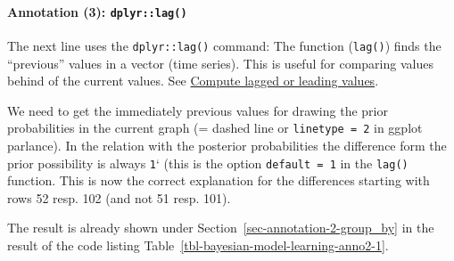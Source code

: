\documentclass[
  letterpaper,
  DIV=11,
  numbers=noendperiod]{scrreprt}
\let\oldparagraph\paragraph
\renewcommand{\paragraph}[1]{\oldparagraph{#1}\mbox{}}
\begin{document}
\hypertarget{sec-annotation-3-lag}{%
\paragraph{\texorpdfstring{Annotation (3):
\texttt{dplyr::lag()}}{Annotation (3): dplyr::lag()}}\label{sec-annotation-3-lag}}

The next line uses the \texttt{dplyr::lag()} command: The function
(\texttt{lag()}) finds the ``previous'' values in a vector (time
series). This is useful for comparing values behind of the current
values. See
\href{https://dplyr.tidyverse.org/reference/lead-lag.html}{Compute
lagged or leading values}.

We need to get the immediately previous values for drawing the prior
probabilities in the current graph (= dashed line or
\texttt{linetype\ =\ 2} in ggplot parlance). In the relation with the
posterior probabilities the difference form the prior possibility is
always \texttt{1}` (this is the option \texttt{default\ =\ 1} in the
\texttt{lag()} function. This is now the correct explanation for the
differences starting with rows 52 resp. 102 (and not 51 resp. 101).

The result is already shown under
Section~\ref{sec-annotation-2-group_by} in the result of the code
listing Table~\ref{tbl-bayesian-model-learning-anno2-1}.
\end{document}
